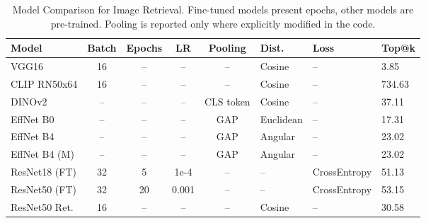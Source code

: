 \begin{table}[htbp]
\centering
\scriptsize
\caption{Model Comparison for Image Retrieval. Fine-tuned models present epochs, other models are pre-trained. Pooling is reported only where explicitly modified in the code.}
\label{tab:model_comparison}
\begin{tabular}{@{\hskip 2pt}l@{\hskip 2pt}c@{\hskip 2pt}c@{\hskip 2pt}c@{\hskip 2pt}c@{\hskip 2pt}l@{\hskip 2pt}l@{\hskip 2pt}l@{\hskip 2pt}}
\toprule
\textbf{Model} & \textbf{Batch} & \textbf{Epochs} & \textbf{LR} & \textbf{Pooling} & \textbf{Dist.} & \textbf{Loss} & \textbf{Top@k} \\
\midrule
VGG16 & 16 & -- & -- & -- & Cosine & -- & 3.85 \\
CLIP RN50x64 & 16 & -- & -- & -- & Cosine & -- & 734.63 \\
DINOv2 & -- & -- & -- & CLS token & Cosine & -- & 37.11 \\
EffNet B0 & -- & -- & -- & GAP & Euclidean & -- & 17.31 \\
EffNet B4 & -- & -- & -- & GAP & Angular & -- & 23.02 \\
EffNet B4 (M) & -- & -- & -- & GAP & Angular & -- & 23.02 \\
ResNet18 (FT) & 32 & 5 & 1e-4 & -- & -- & CrossEntropy & 51.13 \\
ResNet50 (FT) & 32 & 20 & 0.001 & -- & -- & CrossEntropy & 53.15 \\
ResNet50 Ret. & 16 & -- & -- & -- & Cosine & -- & 30.58 \\
\bottomrule
\end{tabular}
\end{table}



